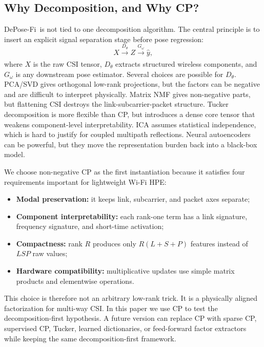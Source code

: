 \documentclass[letterpaper]{article}
\newcommand{\method}{DePose-Fi}
\begin{document}
\subsection{Why Decomposition, and Why CP?}

\method\ is not tied to one decomposition algorithm. The central principle is to insert an explicit signal separation stage before pose regression:
\begin{equation}
X \xrightarrow[]{D_\theta} Z \xrightarrow[]{G_\omega} \hat{y},
\end{equation}
where $X$ is the raw CSI tensor, $D_\theta$ extracts structured wireless components, and $G_\omega$ is any downstream pose estimator. Several choices are possible for $D_\theta$. PCA/SVD gives orthogonal low-rank projections, but the factors can be negative and are difficult to interpret physically. Matrix NMF gives non-negative parts, but flattening CSI destroys the link-subcarrier-packet structure. Tucker decomposition is more flexible than CP, but introduces a dense core tensor that weakens component-level interpretability. ICA assumes statistical independence, which is hard to justify for coupled multipath reflections. Neural autoencoders can be powerful, but they move the representation burden back into a black-box model.

We choose non-negative CP as the first instantiation because it satisfies four requirements important for lightweight Wi-Fi HPE:
\begin{itemize}
    \item \textbf{Modal preservation:} it keeps link, subcarrier, and packet axes separate;
    \item \textbf{Component interpretability:} each rank-one term has a link signature, frequency signature, and short-time activation;
    \item \textbf{Compactness:} rank $R$ produces only $R(L+S+P)$ features instead of $LSP$ raw values;
    \item \textbf{Hardware compatibility:} multiplicative updates use simple matrix products and elementwise operations.
\end{itemize}

This choice is therefore not an arbitrary low-rank trick. It is a physically aligned factorization for multi-way CSI. In this paper we use CP to test the decomposition-first hypothesis. A future version can replace CP with sparse CP, supervised CP, Tucker, learned dictionaries, or feed-forward factor extractors while keeping the same decomposition-first framework.
\end{document}
